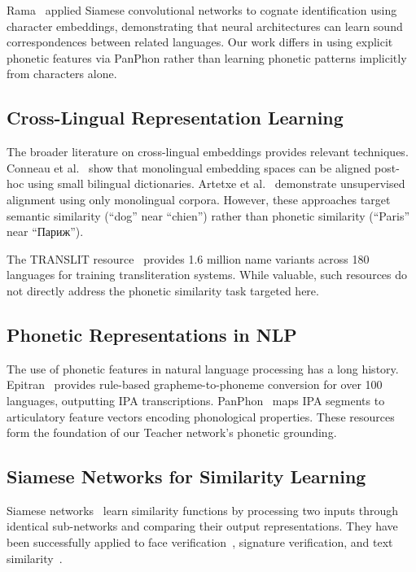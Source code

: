 \documentclass[11pt,a4paper]{article}
\begin{document}
Rama~\citep{rama2016} applied Siamese convolutional networks to cognate identification using character embeddings, demonstrating that neural architectures can learn sound correspondences between related languages. Our work differs in using explicit phonetic features via PanPhon rather than learning phonetic patterns implicitly from characters alone.

\subsection{Cross-Lingual Representation Learning}

The broader literature on cross-lingual embeddings provides relevant techniques. Conneau et al.~\citep{conneau2018} show that monolingual embedding spaces can be aligned post-hoc using small bilingual dictionaries. Artetxe et al.~\citep{artetxe2018} demonstrate unsupervised alignment using only monolingual corpora. However, these approaches target semantic similarity (``dog'' near ``chien'') rather than phonetic similarity (``Paris'' near ``Париж'').

The TRANSLIT resource~\citep{translit2020} provides 1.6 million name variants across 180 languages for training transliteration systems. While valuable, such resources do not directly address the phonetic similarity task targeted here.

\subsection{Phonetic Representations in NLP}

The use of phonetic features in natural language processing has a long history. Epitran~\citep{mortensen2018} provides rule-based grapheme-to-phoneme conversion for over 100 languages, outputting IPA transcriptions. PanPhon~\citep{mortensen2016} maps IPA segments to articulatory feature vectors encoding phonological properties. These resources form the foundation of our Teacher network's phonetic grounding.

\subsection{Siamese Networks for Similarity Learning}

Siamese networks~\citep{bromley1993,chopra2005} learn similarity functions by processing two inputs through identical sub-networks and comparing their output representations. They have been successfully applied to face verification~\citep{schroff2015}, signature verification, and text similarity~\citep{mueller2016,neculoiu2016}.
\end{document}
